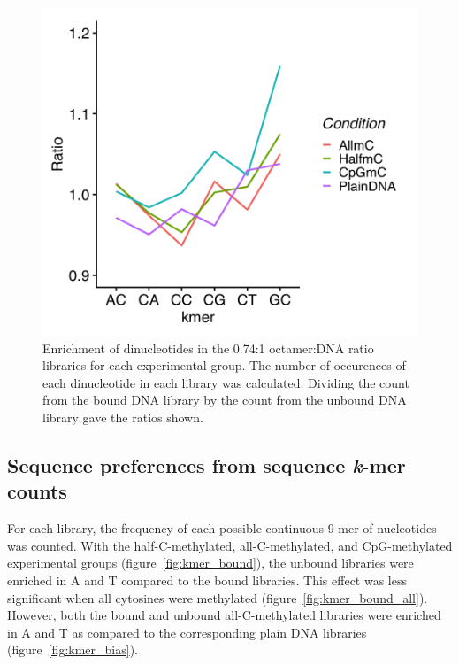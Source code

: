 \documentclass[parskip=full, numbers=noenddot]{scrreprt}
\begin{document}
\begin{figure}[htpb]
  \centering
  \includegraphics[width=\textwidth]{c2nt}
  \caption{Enrichment of dinucleotides in the 0.74:1 octamer:DNA ratio libraries for each experimental group.  The number of occurences of each dinucleotide in each library was calculated.  Dividing the count from the bound DNA library by the count from the unbound DNA library gave the ratios shown.} 
  \label{fig:c2nt}
\end{figure}

\subsection{Sequence preferences from sequence \emph{k}-mer counts}
\label{ssec:nuseqpref_kmer}

For each library, the frequency of each possible continuous 9-mer of nucleotides was counted.  With the half-C-methylated, all-C-methylated, and CpG-methylated experimental groups (figure~\ref{fig:kmer_bound}), the unbound libraries were enriched in A and T compared to the bound libraries.  This effect was less significant when all cytosines were methylated (figure~\ref{fig:kmer_bound_all}).  However, both the bound and unbound all-C-methylated libraries were enriched in A and T as compared to the corresponding plain DNA libraries (figure~\ref{fig:kmer_bias}). 
\end{document}
